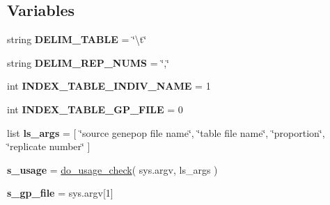 \subsection*{Variables}
\begin{DoxyCompactItemize}
\item 
string {\bfseries D\+E\+L\+I\+M\+\_\+\+T\+A\+B\+LE} = \char`\"{}\textbackslash{}t\char`\"{}\hypertarget{namespacenegui_1_1indiv_a3a1f78dc2a9d479db9c8b65ec2fb4611}{}\label{namespacenegui_1_1indiv_a3a1f78dc2a9d479db9c8b65ec2fb4611}

\item 
string {\bfseries D\+E\+L\+I\+M\+\_\+\+R\+E\+P\+\_\+\+N\+U\+MS} = \char`\"{},\char`\"{}\hypertarget{namespacenegui_1_1indiv_a6cf14c53352599f05c6cde3ef2f78895}{}\label{namespacenegui_1_1indiv_a6cf14c53352599f05c6cde3ef2f78895}

\item 
int {\bfseries I\+N\+D\+E\+X\+\_\+\+T\+A\+B\+L\+E\+\_\+\+I\+N\+D\+I\+V\+\_\+\+N\+A\+ME} = 1\hypertarget{namespacenegui_1_1indiv_ab3877ee44596d0bd2b3c07c666611013}{}\label{namespacenegui_1_1indiv_ab3877ee44596d0bd2b3c07c666611013}

\item 
int {\bfseries I\+N\+D\+E\+X\+\_\+\+T\+A\+B\+L\+E\+\_\+\+G\+P\+\_\+\+F\+I\+LE} = 0\hypertarget{namespacenegui_1_1indiv_ac398f57107a06c4338c3ab91398ddf53}{}\label{namespacenegui_1_1indiv_ac398f57107a06c4338c3ab91398ddf53}

\item 
list {\bfseries ls\+\_\+args} = \mbox{[} \char`\"{}source genepop file name\char`\"{}, \char`\"{}table file name\char`\"{}, \char`\"{}proportion\char`\"{}, \char`\"{}replicate number\char`\"{} \mbox{]}\hypertarget{namespacenegui_1_1indiv_a954e662425e80bfdfe9eb2bffc1ca272}{}\label{namespacenegui_1_1indiv_a954e662425e80bfdfe9eb2bffc1ca272}

\item 
{\bfseries s\+\_\+usage} = \hyperlink{namespacenegui_1_1indiv_a8d366fcefa810f96a2cc323b84d6ea75}{do\+\_\+usage\+\_\+check}( sys.\+argv, ls\+\_\+args )\hypertarget{namespacenegui_1_1indiv_a62f86febe6d7e98a49a96574627409f0}{}\label{namespacenegui_1_1indiv_a62f86febe6d7e98a49a96574627409f0}

\item 
{\bfseries s\+\_\+gp\+\_\+file} = sys.\+argv\mbox{[}1\mbox{]}\hypertarget{namespacenegui_1_1indiv_a16e11fa40b04606fa28575e8f10277e7}{}\label{namespacenegui_1_1indiv_a16e11fa40b04606fa28575e8f10277e7}


\end{DoxyCompactItemize}
